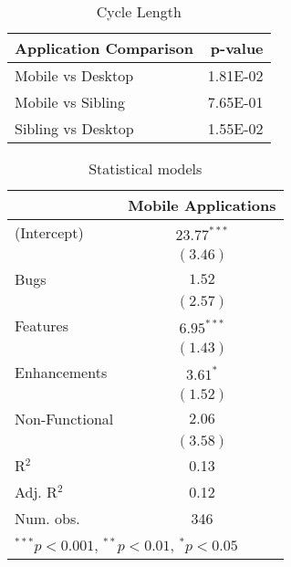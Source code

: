 \begin{table}[ht]
\centering
\caption{Cycle Length} 
\begin{tabular}{lr}
  \hline
Application Comparison & p-value \\ 
  \hline
Mobile vs Desktop & 1.81E-02 \\ 
  Mobile vs Sibling & 7.65E-01 \\ 
  Sibling vs Desktop & 1.55E-02 \\ 
   \hline
\end{tabular}
\end{table}

\begin{table}
\begin{center}
\begin{tabular}{l c }
\hline
               & Mobile Applications \\
\hline
(Intercept)    & $23.77^{***}$ \\
               & $(3.46)$      \\
Bugs           & $1.52$        \\
               & $(2.57)$      \\
Features       & $6.95^{***}$  \\
               & $(1.43)$      \\
Enhancements   & $3.61^{*}$    \\
               & $(1.52)$      \\
Non-Functional & $2.06$        \\
               & $(3.58)$      \\
\hline
R$^2$          & 0.13          \\
Adj. R$^2$     & 0.12          \\
Num. obs.      & 346           \\
\hline
\multicolumn{2}{l}{\scriptsize{$^{***}p<0.001$, $^{**}p<0.01$, $^*p<0.05$}}
\end{tabular}
\caption{Statistical models}
\label{table:coefficients}
\end{center}
\end{table}
